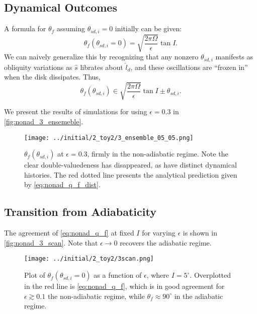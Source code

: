 \documentclass[
        fleqn,
        usenatbib,
    ]{mnras}
\newcommand*{\p}[1]{\left(#1\right)}
\begin{document}
\subsection{Dynamical Outcomes}

A formula for $\theta_{f}$ assuming $\theta_{sd, i} = 0$ initially can be
given:
\begin{equation}
    \theta_{f}\p{\theta_{sd, i} = 0} = \sqrt{\frac{2\pi \Omega}{\epsilon}}
        \tan I.\label{eq:nonad_q_f}
\end{equation}
We can naively generalize this by recognizing that any nonzero $\theta_{sd, i}$
manifests as obliquity variations as $\hat{s}$ librates about $\hat{l}_d$, and
these oscillations are ``frozen in'' when the disk dissipates. Thus,
\begin{equation}
    \theta_{f}\p{\theta_{sd, i}} \in \sqrt{\frac{2\pi \Omega}{\epsilon}}
        \tan I \pm \theta_{sd, i}.\label{eq:nonad_q_f_dist}
\end{equation}

We present the results of simulations for using $\epsilon = 0.3$ in
\autoref{fig:nonad_3_ensemeble}.
\begin{figure}
    \centering
    \texttt{[image: ../initial/2\_toy2/3\_ensemble\_05\_05.png]}
    \caption{$\theta_{ f}\p{\theta_{sd, i}}$ at $\epsilon = 0.3$, firmly in
    the non-adiabatic regime. Note the clear double-valuedeness has disappeared,
    as have distinct dynamical histories. The red dotted line presents the
    analytical prediction given by
    \autoref{eq:nonad_q_f_dist}.}\label{fig:nonad_3_ensemeble}
\end{figure}

\subsection{Transition from Adiabaticity}

The agreement of \autoref{eq:nonad_q_f} at fixed $I$ for varying $\epsilon$ is
shown in \autoref{fig:nonad_3_scan}. Note that $\epsilon \to 0$ recovers the
adiabatic regime.
\begin{figure}
    \centering
    \texttt{[image: ../initial/2\_toy2/3scan.png]}
    \caption{Plot of $\theta_{ f}\p{\theta_{sd, i} = 0}$ as a function of
    $\epsilon$, where $I = 5^\circ$. Overplotted in the red line is
    \autoref{eq:nonad_q_f}, which is in good agreement for $\epsilon \gtrsim
    0.1$ the non-adiabatic regime, while $\theta_{ f} \approx 90^\circ$ in
    the adiabatic regime.}\label{fig:nonad_3_scan}
\end{figure}
\end{document}
